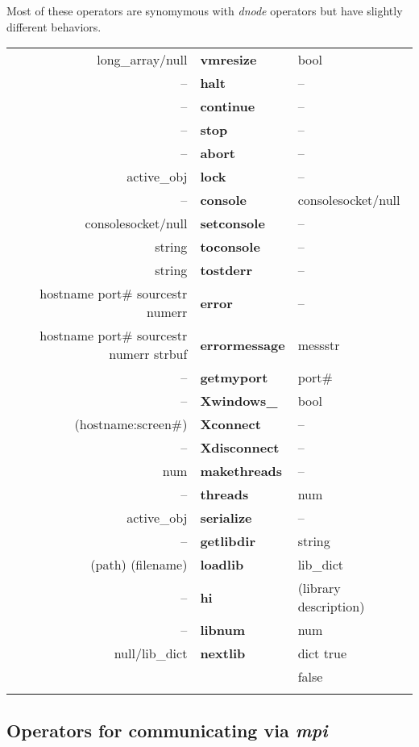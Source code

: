 Most of these operators are synomymous with \emph{dnode} operators but have slightly different behaviors.
\begin{tabular}{>{\sffamily}r>{\sffamily\bfseries}l>{\sffamily}l}
long\_array/null  & vmresize & bool\\
-- & halt & --\\
-- & continue & --\\
-- & stop & --\\
-- & abort & --\\
active\_obj & lock & --\\ 
-- & console & consolesocket/null\\
consolesocket/null & setconsole & --\\
string & toconsole & --\\
string & tostderr & --\\
hostname port\# sourcestr numerr & error & --\\
hostname port\# sourcestr numerr strbuf & errormessage & messstr\\
-- & getmyport & port\#\\
-- & Xwindows\_ & bool\\
(hostname:screen\#) & Xconnect & --\\
-- & Xdisconnect & -- \\
num & makethreads & --\\ 
-- & threads & num\\ 
active\_obj & serialize & --\\
-- & getlibdir & string\\
(path) (filename) & loadlib & lib\_dict\\
-- & hi & (library description)\\
-- & libnum & num\\
null/lib\_dict & nextlib & dict true\\
               &         & false\\\\
\end{tabular}


\subsection{Operators for communicating via \emph{mpi}}
    

